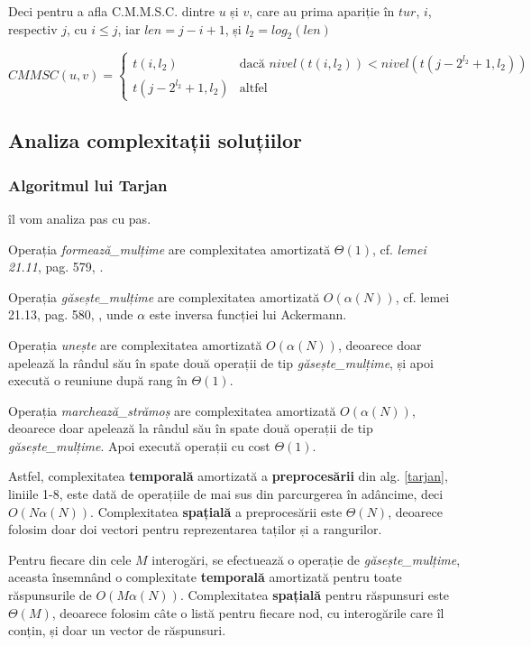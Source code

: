 \documentclass[runningheads]{llncs}
\begin{document}
Deci pentru a afla C.M.M.S.C. dintre $u$ și $v$, care au prima apariție în $tur$, $i$, respectiv $j$, cu $i \leq j$, iar $len = j - i + 1$, și $l_2 = log_2(len)$

$$ CMMSC(u, v) =
\left\{
	\begin{array}{ll}
	    \mbox{$t(i, l_2)$} & \mbox{dacă $nivel(t(i, l_2)) < nivel(t(j-2^{l_2} + 1, l_2))$}\\
		\mbox{$t(j-2^{l_2} + 1, l_2)$}  & \mbox{altfel}
	\end{array}
\right.
$$

\subsection{Analiza complexitații soluțiilor}

\subsubsection{Algoritmul lui Tarjan} îl vom analiza pas cu pas. 

Operația \emph{formează\_mulțime} are complexitatea amortizată $\Theta(1)$, cf. \emph{lemei 21.11}, pag. 579, \cite{CLRS}.

Operația \emph{găsește\_mulțime} are complexitatea amortizată $O(\alpha(N))$, cf. lemei 21.13, pag. 580, \cite{CLRS}, unde $\alpha$ este inversa funcției lui Ackermann.

Operația \emph{unește} are complexitatea amortizată $O(\alpha(N))$, deoarece doar apelează la rândul său în spate două operații de tip \emph{găsește\_mulțime}, și apoi execută o reuniune după rang în $\Theta(1)$.

Operația \emph{marchează\_strămoș} are complexitatea amortizată $O(\alpha(N))$, deoarece doar apelează la rândul său în spate două operații de tip \emph{găsește\_mulțime}. Apoi execută operații cu cost $\Theta(1)$.

Astfel, complexitatea \textbf{temporală} amortizată a \textbf{preprocesării} din alg. \ref{tarjan}, liniile 1-8, este dată de operațiile de mai sus din parcurgerea în adâncime, deci $O(N\alpha(N))$. Complexitatea \textbf{spațială} a preprocesării este $\Theta(N)$, deoarece folosim doar doi vectori pentru reprezentarea taților și a rangurilor.

Pentru fiecare din cele $M$ interogări, se efectuează o operație de \emph{găsește\_mulțime}, aceasta însemnând o complexitate \textbf{temporală} amortizată pentru toate răspunsurile de $O(M\alpha(N))$. Complexitatea \textbf{spațială} pentru răspunsuri este $\Theta(M)$, deoarece folosim câte o listă pentru fiecare nod, cu interogările care îl conțin, și doar un vector de răspunsuri.
\end{document}
